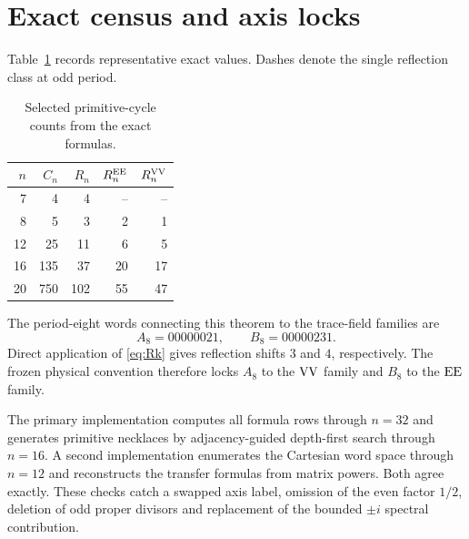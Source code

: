 \section{Exact census and axis locks}

Table~\ref{tab:census} records representative exact values.  Dashes denote
the single reflection class at odd period.
\begin{table}[ht]
\centering
\begin{tabular}{rrrrr}
\toprule
$n$ & $C_n$ & $R_n$ & $R_n^{\mathrm{EE}}$ & $R_n^{\mathrm{VV}}$\\
\midrule
7  & 4   & 4   & -- & --\\
8  & 5   & 3   & 2  & 1\\
12 & 25  & 11  & 6  & 5\\
16 & 135 & 37  & 20 & 17\\
20 & 750 & 102 & 55 & 47\\
\bottomrule
\end{tabular}
\caption{Selected primitive-cycle counts from the exact formulas.}
\label{tab:census}
\end{table}

The period-eight words connecting this theorem to the trace-field families
are
\[
A_8=00000021,\qquad B_8=00000231.
\]
Direct application of \eqref{eq:Rk} gives reflection shifts $3$ and $4$,
respectively.  The frozen physical convention therefore locks $A_8$ to the
$\mathrm{VV}$ family and $B_8$ to the $\mathrm{EE}$ family.

The primary implementation computes all formula rows through $n=32$ and
generates primitive necklaces by adjacency-guided depth-first search through
$n=16$.  A second implementation enumerates the Cartesian word space through
$n=12$ and reconstructs the transfer formulas from matrix powers.  Both agree
exactly.  These checks catch a swapped axis label, omission of the even factor
$1/2$, deletion of odd proper divisors and replacement of the bounded
$\pm i$ spectral contribution.
